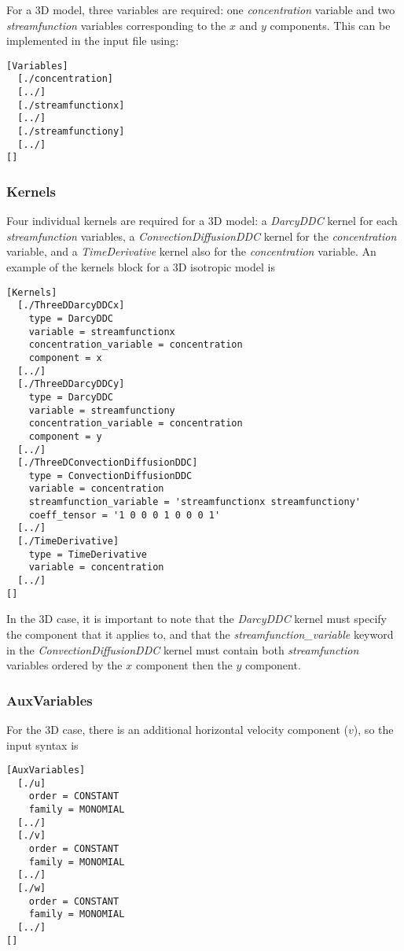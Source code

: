 \documentclass[11pt, a4paper]{csiroreport2012}
\begin{document}
For a 3D model, three variables are required: one \emph{concentration} variable and two \emph{streamfunction} variables corresponding to the $x$ and $y$ components. This can be implemented in the input file using:
\begin{verbatim}
[Variables]  
  [./concentration]  
  [../]  
  [./streamfunctionx]  
  [../]  
  [./streamfunctiony]  
  [../]  
[]
\end{verbatim}

\subsubsection*{Kernels}

Four individual kernels are required for a 3D model: a \emph{DarcyDDC} kernel for each \emph{streamfunction} variables, a \emph{ConvectionDiffusionDDC} kernel for the \emph{concentration} variable, and a \emph{TimeDerivative} kernel also for the \emph{concentration} variable. An example of the kernels block for a 3D isotropic model is
\begin{verbatim}
[Kernels]
  [./ThreeDDarcyDDCx]
    type = DarcyDDC
    variable = streamfunctionx
    concentration_variable = concentration
    component = x
  [../]
  [./ThreeDDarcyDDCy]
    type = DarcyDDC
    variable = streamfunctiony
    concentration_variable = concentration
    component = y
  [../]
  [./ThreeDConvectionDiffusionDDC]
    type = ConvectionDiffusionDDC
    variable = concentration
    streamfunction_variable = 'streamfunctionx streamfunctiony'
    coeff_tensor = '1 0 0 0 1 0 0 0 1'
  [../]
  [./TimeDerivative]
    type = TimeDerivative
    variable = concentration
  [../]
[]
\end{verbatim}

In the 3D case, it is important to note that the \emph{DarcyDDC} kernel must specify the component that it applies to, and that the \emph{streamfunction\_variable} keyword in the \emph{ConvectionDiffusionDDC} kernel must contain both \emph{streamfunction} variables ordered by the $x$ component then the $y$ component.

\subsubsection*{AuxVariables}

For the 3D case, there is an additional horizontal velocity component ($v$), so the input syntax is
\begin{verbatim}
[AuxVariables]
  [./u]
    order = CONSTANT
    family = MONOMIAL
  [../]
  [./v]
    order = CONSTANT
    family = MONOMIAL
  [../]
  [./w]
    order = CONSTANT
    family = MONOMIAL
  [../]
[]
\end{verbatim}
\end{document}

